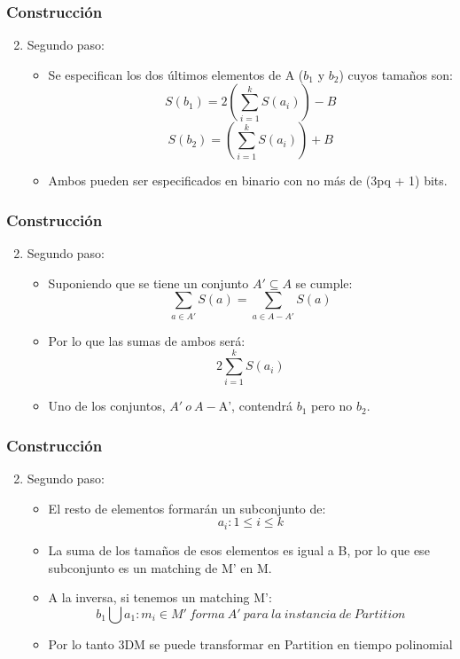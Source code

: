 \documentclass{beamer}
\begin{document}

\begin{frame}
\frametitle{Construcci\'on}
\begin{enumerate}
\setcounter{enumi}{1}
\item Segundo paso:
\begin{itemize}
\item Se especifican los dos \'ultimos elementos de A ($b_{1}$ y $b_{2}$) cuyos
tama\~{n}os son:
$$S(b_{1}) = 2(\sum\limits_{i=1}^{k}S(a_{i})) - B $$
$$S(b_{2}) = (\sum\limits_{i=1}^{k}S(a_{i})) + B $$
\item Ambos pueden ser especificados en binario con no m\'as de (3pq + 1) bits.
\end{itemize}

\end{enumerate}

\end{frame}


\begin{frame}
\frametitle{Construcci\'on}
\begin{enumerate}
\setcounter{enumi}{1}
\item Segundo paso:
\begin{itemize}
\item Suponiendo que se tiene un conjunto $A' \subseteq A$ se cumple:
$$\sum\limits_{a \in A'} S(a) = \sum\limits_{a \in A - A'} S(a)$$
\item Por lo que las sumas de ambos ser\'a:
$$ 2\sum\limits_{i=1}^{k}S(a_{i})$$
\item Uno de los conjuntos, $A'\ o \ A - $A', contendr\'a $b_{1}$ pero no $b_{2}$.
\end{itemize}

\end{enumerate}

\end{frame}


\begin{frame}
\frametitle{Construcci\'on}
\begin{enumerate}
\setcounter{enumi}{1}
\item Segundo paso:
\begin{itemize}
\item El resto de elementos formar\'an un subconjunto de:
$$a_{i}: 1 \leq i \leq k$$
\item La suma de los tama\~{n}os de esos elementos es igual a B, por lo que ese
subconjunto es un matching de M' en M.
\item A la inversa, si tenemos un matching M':
$${b_{1} \bigcup {a_{1}}: m_{i} \in M' \ forma \ A' \ para \ la \ instancia \ de \ Partition } $$
\item Por lo tanto 3DM se puede transformar en Partition en tiempo polinomial
\end{itemize}

\end{enumerate}

\end{frame}
\end{document}
